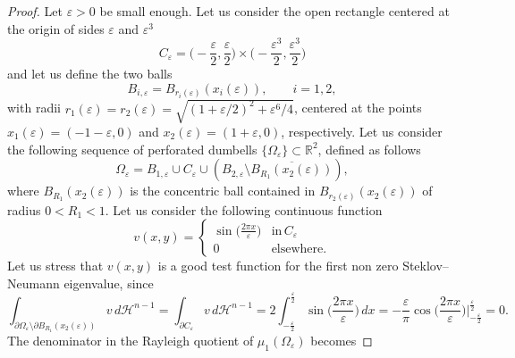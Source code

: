 \documentclass[10pt,a4paper]{amsart}
\begin{document}
\begin{proof}
Let $\varepsilon>0$ be small enough. Let us consider  the open  rectangle centered at the origin of sides $\varepsilon$ and $\varepsilon^3$ 
\begin{equation*}
C_{\varepsilon}= \bigg(-\frac{\varepsilon}{2},\frac{\varepsilon}{2}\bigg)\times \bigg(-\frac{\varepsilon^3}{2},\frac{\varepsilon^3}{2}\bigg)
\end{equation*}
 and let us define  the two balls
\begin{equation*}
    B_{i,\varepsilon}=B_{r_i(\varepsilon)}(x_i(\varepsilon)),  \qquad i=1,2,
\end{equation*}
with radii $r_1(\varepsilon)=r_2(\varepsilon)= \sqrt{(1+\varepsilon/2)^2+\varepsilon^6/4}$, centered at the points $x_1(\varepsilon)=(-1-\varepsilon,0)$ and $x_2(\varepsilon)= (1+\varepsilon,0)$, respectively.
Let us consider the following sequence of perforated dumbells $\{\Omega_\varepsilon\}\subset \mathbb{R}^2 $, defined as follows
\begin{equation*}
	\Omega_\varepsilon = B_{1,\varepsilon}\cup C_{\varepsilon}\cup (B_{2,\varepsilon}\setminus \overline{B_{R_1}(x_2(\varepsilon))}),
\end{equation*}
where $B_{R_1}(x_2(\varepsilon))$ is the concentric ball contained in $B_{r_2(\varepsilon)}(x_2(\varepsilon))$ of radius $0<R_1<1$. Let us consider the following continuous function
\begin{equation*}
	v(x,y)= \begin{cases}
	\sin \bigg(\displaystyle\frac{2\pi x}{\varepsilon}\bigg) & \text{in} \, C_{\varepsilon}\\
	0 & \text{elsewhere}.
	\end{cases}
\end{equation*}
Let us stress that $v(x,y)$ is a good test function for the first non zero Steklov--Neumann eigenvalue, since
\begin{equation*}
    \int_{\partial \Omega_\varepsilon\setminus \partial B_{R_1}(x_2(\varepsilon))}v\,d\mathcal{H}^{n-1}  = \int_{\partial C_\varepsilon}v\,d\mathcal{H}^{n-1} = 2\int_{-\frac{\varepsilon}{2}}^{\frac{\varepsilon}{2}}\sin\bigg(\displaystyle\frac{2\pi x}{\varepsilon}\bigg)\,dx = -\frac{\varepsilon}{\pi}\cos \bigg(\displaystyle\frac{2\pi x}{\varepsilon}\bigg)\Bigg|_{-\frac{\varepsilon}{2}}^{\frac{\varepsilon}{2}}=0.
\end{equation*}
The denominator in the Rayleigh quotient of $\mu_1(\Omega_\varepsilon)$ becomes


\end{proof}
\end{document}
